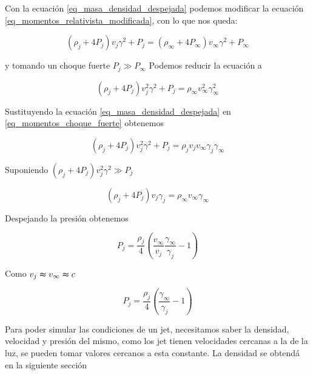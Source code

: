 \documentclass[12pt,a4paper]{book}
\begin{document}
Con la ecuación \ref{eq_masa_densidad_despejada} podemos modificar la ecuación \ref{eq_momentos_relativista_modificada}, con lo que nos queda:

\begin{equation}
  \left( \rho_j + 4P_j \right)v_j \gamma^2 +P_j = \left( \rho_\infty + 4P_\infty \right)v_\infty \gamma^2 +P_\infty
\end{equation}

y tomando un choque fuerte $P_j \gg P_\infty $ Podemos reducir la ecuación a 

\begin{equation} \label{eq_momentos_choque_fuerte}
  \left( \rho_j + 4P_j \right)v_j^2 \gamma^2 +P_j =  \rho_\infty  v_\infty^2 \gamma_{\infty}^{2} 
\end{equation}

Sustituyendo la ecuación \ref{eq_masa_densidad_despejada} en \ref{eq_momentos_choque_fuerte} obtenemos

\begin{equation} \label{eq_momentos_choque_fuerte}
  \left( \rho_j + 4P_j \right)v_j^2 \gamma^2 +P_j = \rho_j v_j v_\infty \gamma_j \gamma_\infty
\end{equation}

Suponiendo $\left( \rho_j + 4P_j \right)v_j^2 \gamma^2 \gg P_j $



\begin{equation}
  \left( \rho_j + 4P_j \right)v_j \gamma_j = \rho_\infty v_\infty  \gamma_\infty
\end{equation}

Despejando la presión obtenemos

\begin{equation}
  P_j = \frac{\rho_j}{4}\left(\frac{v_\infty}{v_j} \frac{\gamma_\infty}{\gamma_j}-1\right)
\end{equation}

Como $v_j \thickapprox v_\infty \thickapprox c$

\begin{equation}
  P_j = \frac{\rho_j}{4}\left( \frac{\gamma_\infty}{\gamma_j}-1\right)
\end{equation}

Para poder simular las condiciones de un jet, necesitamos saber la densidad, velocidad y presión del mismo, como los jet tienen velocidades cercanas a la
de la luz, se pueden tomar valores cercanos a esta constante. La densidad se obtendá en la siguiente sección 
\end{document}
